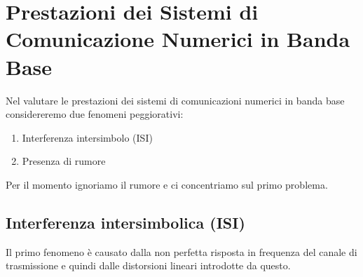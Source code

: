 \section*{Prestazioni dei Sistemi di Comunicazione Numerici in Banda Base}
Nel valutare le prestazioni dei sistemi di comunicazioni numerici in banda base considereremo due fenomeni peggiorativi:
\begin{enumerate}
    \item Interferenza intersimbolo (ISI)
    \item Presenza di rumore
\end{enumerate}

Per il momento ignoriamo il rumore e ci concentriamo sul primo problema.

\subsection*{Interferenza intersimbolica (ISI)}
Il primo fenomeno è causato dalla non perfetta risposta in frequenza del canale di trasmissione e quindi dalle distorsioni lineari introdotte da questo.

